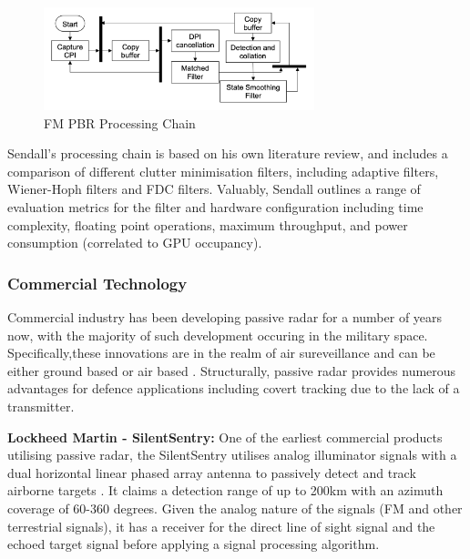 \documentclass[12pt,a4paper]{article}
\begin{document}
\begin{figure}[htbp]
    \centering
    \includegraphics[width=0.7\textwidth]{filterChain.png}
    \caption{FM PBR Processing Chain \cite{FMlowCost}}
    \label{fig:fmChain}
\end{figure}

\par \vspace{0.5cm} 
\noindent Sendall's processing chain is based on his own literature review, and includes a comparison of different clutter minimisation filters, including adaptive filters, Wiener-Hoph filters and FDC filters. Valuably, Sendall outlines a range of evaluation metrics for the filter and hardware configuration including time complexity, floating point operations, maximum throughput, and power consumption (correlated to GPU occupancy).

\subsubsection{Commercial Technology}
Commercial industry has been developing passive radar for a number of years now, with the majority of such development occuring in the military space. Specifically,these innovations are in the realm of air sureveillance and can be either ground based or air based \cite{FundamentalsPassiveRadar}. Structurally, passive radar provides numerous advantages for defence applications including covert tracking due to the lack of a transmitter.
\par \vspace{0.5cm} 
\noindent \textbf{Lockheed Martin - SilentSentry:} One of the earliest commercial products utilising passive radar, the SilentSentry utilises analog illuminator signals with a dual horizontal linear phased array antenna to passively detect and track airborne targets \cite{DTSO2009}. It claims a detection range of up to 200km with an azimuth coverage of 60-360 degrees. Given the analog nature of the signals (FM and other terrestrial signals), it has a receiver for the direct line of sight signal and the echoed target signal before applying a signal processing algorithm.
\end{document}
